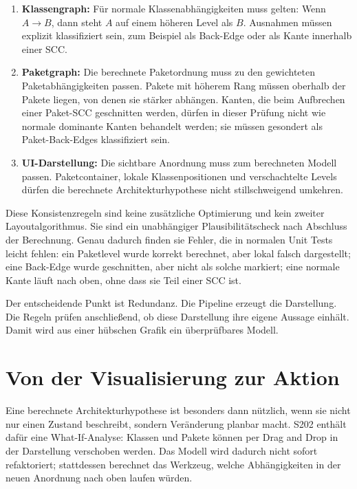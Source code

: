 \documentclass[a4paper,11pt]{article}
\begin{document}
\begin{enumerate}
  \item \textbf{Klassengraph:} F\"ur normale Klassenabh\"angigkeiten muss
        gelten: Wenn $A \to B$, dann steht $A$ auf einem h\"oheren Level als
        $B$. Ausnahmen m\"ussen explizit klassifiziert sein, zum Beispiel als
        Back-Edge oder als Kante innerhalb einer SCC.
  \item \textbf{Paketgraph:} Die berechnete Paketordnung muss zu den
        gewichteten Paketabh\"angigkeiten passen. Pakete mit h\"oherem Rang
        m\"ussen oberhalb der Pakete liegen, von denen sie st\"arker abh\"angen.
        Kanten, die beim Aufbrechen einer Paket-SCC geschnitten werden, d\"urfen
        in dieser Pr\"ufung nicht wie normale dominante Kanten behandelt werden;
        sie m\"ussen gesondert als Paket-Back-Edges klassifiziert sein.
  \item \textbf{UI-Darstellung:} Die sichtbare Anordnung muss zum berechneten
        Modell passen. Paketcontainer, lokale Klassenpositionen und
        verschachtelte Levels d\"urfen die berechnete Architekturhypothese nicht
        stillschweigend umkehren.
\end{enumerate}

Diese Konsistenzregeln sind keine zus\"atzliche Optimierung und kein zweiter
Layoutalgorithmus. Sie sind ein unabh\"angiger Plausibilit\"atscheck nach
Abschluss der Berechnung. Genau dadurch finden sie Fehler, die in normalen
Unit Tests leicht fehlen: ein Paketlevel wurde korrekt berechnet, aber lokal
falsch dargestellt; eine Back-Edge wurde geschnitten, aber nicht als solche
markiert; eine normale Kante l\"auft nach oben, ohne dass sie Teil einer SCC ist.

Der entscheidende Punkt ist Redundanz. Die Pipeline erzeugt die Darstellung.
Die Regeln pr\"ufen anschlie\ss{}end, ob diese Darstellung ihre eigene Aussage
einh\"alt. Damit wird aus einer h\"ubschen Grafik ein \"uberpr\"ufbares Modell.

\section{Von der Visualisierung zur Aktion}

Eine berechnete Architekturhypothese ist besonders dann n\"utzlich, wenn sie
nicht nur einen Zustand beschreibt, sondern Ver\"anderung planbar macht. S202
enth\"alt daf\"ur eine What-If-Analyse: Klassen und Pakete k\"onnen per Drag
and Drop in der Darstellung verschoben werden. Das Modell wird dadurch nicht
sofort refaktoriert; stattdessen berechnet das Werkzeug, welche Abh\"angigkeiten
in der neuen Anordnung nach oben laufen w\"urden.
\end{document}
